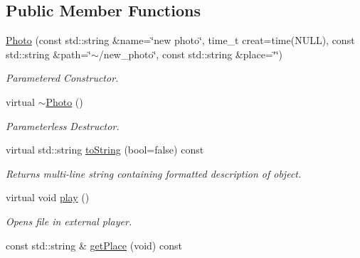 \subsection*{Public Member Functions}
\begin{DoxyCompactItemize}
\item 
\hypertarget{classPhoto_ab07e00487a31f231f4730b3859664da5}{\hyperlink{classPhoto_ab07e00487a31f231f4730b3859664da5}{Photo} (const std\+::string \&name=\char`\"{}new photo\char`\"{}, time\+\_\+t creat=time(N\+U\+L\+L), const std\+::string \&path=\char`\"{}$\sim$/new\+\_\+photo\char`\"{}, const std\+::string \&place=\char`\"{}\char`\"{})}\label{classPhoto_ab07e00487a31f231f4730b3859664da5}

\begin{DoxyCompactList}\small\item\em Parametered Constructor. \end{DoxyCompactList}\item 
virtual \hyperlink{classPhoto_adc366234be6226600360c7cbba8e7fcf}{$\sim$\+Photo} ()
\begin{DoxyCompactList}\small\item\em Parameterless Destructor. \end{DoxyCompactList}\item 
\hypertarget{classPhoto_a9ea8f215df772495c523a8ba82e3586c}{virtual std\+::string \hyperlink{classPhoto_a9ea8f215df772495c523a8ba82e3586c}{to\+String} (bool=false) const }\label{classPhoto_a9ea8f215df772495c523a8ba82e3586c}

\begin{DoxyCompactList}\small\item\em Returns multi-\/line string containing formatted description of object. \end{DoxyCompactList}\item 
\hypertarget{classPhoto_a145e0540284cbc678ef5bdb02a8fcaa8}{virtual void \hyperlink{classPhoto_a145e0540284cbc678ef5bdb02a8fcaa8}{play} ()}\label{classPhoto_a145e0540284cbc678ef5bdb02a8fcaa8}

\begin{DoxyCompactList}\small\item\em Opens file in external player. \end{DoxyCompactList}\item 
\hypertarget{classPhoto_a310123a0d107ab078bc83a80b484e2c1}{const std\+::string \& \hyperlink{classPhoto_a310123a0d107ab078bc83a80b484e2c1}{get\+Place} (void) const }\label{classPhoto_a310123a0d107ab078bc83a80b484e2c1}


\end{DoxyCompactItemize}
